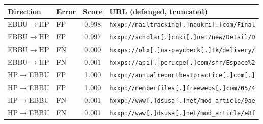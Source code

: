 \begin{tabular}{llcl}
\toprule
Direction & Error & Score & URL (defanged, truncated) \\
\midrule
EBBU$\rightarrow$HP & FP & 0.998 & \texttt{\scriptsize hxxp://mailtracking[.]naukri[.]com/Final} \\
EBBU$\rightarrow$HP & FP & 0.997 & \texttt{\scriptsize hxxp://scholar[.]cnki[.]net/new/Detail/D} \\
EBBU$\rightarrow$HP & FN & 0.000 & \texttt{\scriptsize hxxps://olx[.]ua-paycheck[.]tk/delivery/} \\
EBBU$\rightarrow$HP & FN & 0.001 & \texttt{\scriptsize hxxps://api[.]perucpe[.]com/sfr/Espace\%2} \\
HP$\rightarrow$EBBU & FP & 1.000 & \texttt{\scriptsize hxxp://annualreportbestpractice[.]com[.]} \\
HP$\rightarrow$EBBU & FP & 1.000 & \texttt{\scriptsize hxxp://memberfiles[.]freewebs[.]com/05/4} \\
HP$\rightarrow$EBBU & FN & 0.001 & \texttt{\scriptsize hxxp://www[.]dsusa[.]net/mod\_article/9ae} \\
HP$\rightarrow$EBBU & FN & 0.001 & \texttt{\scriptsize hxxp://www[.]dsusa[.]net/mod\_article/e8f} \\
\bottomrule
\end{tabular}
